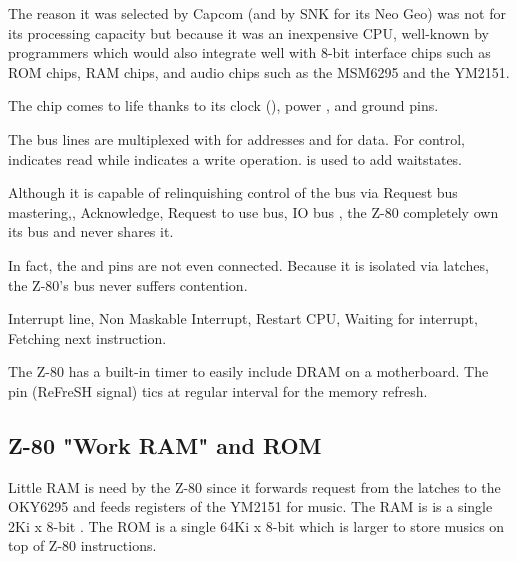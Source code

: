 The reason it was selected by Capcom (and by SNK for its Neo Geo) was not for its processing capacity but because it was an inexpensive CPU, well-known by programmers which would also integrate well with 8-bit interface chips such as ROM chips, RAM chips, and audio chips such as the MSM6295 and the YM2151.






The chip comes to life thanks to its clock (), power , and ground  pins.

The bus lines are multiplexed with  for addresses and  for data. For control,  indicates read while  indicates a write operation.  is used to add waitstates. 

Although it is capable of relinquishing control of the bus via  Request bus mastering,, Acknowledge,  Request to use bus, IO bus , the Z-80 completely own its bus and never shares it. 

In fact, the  and  pins are not even connected.  Because it is isolated via latches, the Z-80's bus never suffers contention.


 Interrupt line,  Non Maskable Interrupt,  Restart CPU,  Waiting for interrupt,  Fetching next instruction.

\begin{trivia}
 The Z-80 has a built-in timer to easily include DRAM on a motherboard. The  pin (ReFreSH signal) tics at regular interval for the memory refresh.
\end{trivia}

\subsection{Z-80 "Work RAM" and ROM}
Little RAM is need by the Z-80 since it forwards request from the latches to the OKY6295 and feeds registers  of the YM2151 for music. The RAM is is a single 2Ki x 8-bit . The ROM is a single 64Ki x 8-bit  which is larger to store musics on top of Z-80 instructions. 



